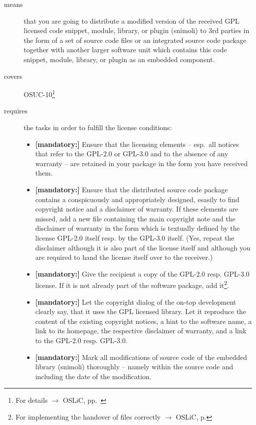 \begin{description}
\item[means] that you are going to distribute a modified version of the received
GPL licensed code snippet, module, library, or plugin (snimoli) to 3rd
parties in the form of a set of source code files or an integrated source code
package together with another larger software unit which contains this code
snippet, module, library, or plugin as an embedded component.
\item[covers] OSUC-10\footnote{For details $\rightarrow$ OSLiC, pp.\ \pageref{OSUC-10-DEF}}
\item[requires] the tasks in order to fulfill the license conditions:
\begin{itemize}


  \item \textbf{[mandatory:]} Ensure that the licensing elements -- esp.\ all
  notices that refer to the GPL-2.0 or GPL-3.0 and to the absence of any
  warranty -- are retained in your package in the form you have received them.

  \item \textbf{[mandatory:]} Ensure that the distributed source code package
  contains a conspicuously and appropriately designed, esasily to find copyright
  notice and a disclaimer of warranty. If these elements are missed, add a new
  file containing the main copyright note and the disclaimer of warranty in the
  form which is textually defined by the license GPL-2.0 itself resp. by the
  GPL-3.0 itself. (Yes, repeat the disclaimer although it is also part of the
  license itself and although you are required to hand the license itself over
  to the receiver.)
  
  \item \textbf{[mandatory:]} Give the recipient a copy of the GPL-2.0 resp.
  GPL-3.0 license. If it is not already part of the software package, add
  it\footnote{For implementing the handover of files correctly $\rightarrow$
  OSLiC, p. \pageref{DistributingFilesHint}}.
  
  \item \textbf{[mandatory:]} Let the copyright dialog of the on-top development
  clearly say, that it uses the GPL licensed library. Let it reproduce the
  content of the existing copyright notices, a hint to the software name, a link
  to its homepage, the respective disclaimer of warranty, and a link to the
  GPL-2.0 resp. GPL-3.0.  
    
  \item \textbf{[mandatory:]} Mark all modifications of source code of the
  embedded library (snimoli) thoroughly --
  namely within the source code and including the date of the modification.


\end{itemize}
\end{description}
